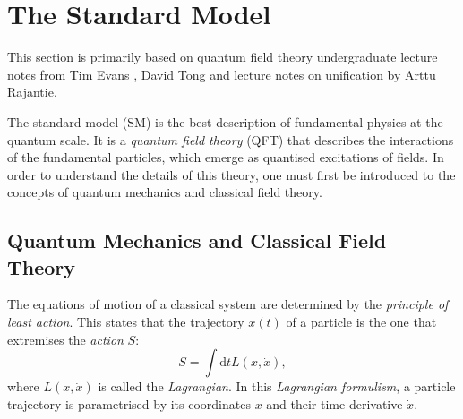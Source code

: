 \section{The Standard Model}
This section is primarily based on quantum field theory undergraduate lecture notes from Tim Evans \cite{timevans}, David Tong \cite{tong} and lecture notes on unification by Arttu Rajantie.

The standard model (SM) is the best description of fundamental physics at the quantum scale. It is a \textit{quantum field theory} (QFT) that describes the interactions of the fundamental particles, which emerge as quantised excitations of fields. In order to understand the details of this theory, one must first be introduced to the concepts of quantum mechanics and classical field theory.

\subsection{Quantum Mechanics and Classical Field Theory}

The equations of motion of a classical system are determined by the \textit{principle of least action}. This states that the trajectory $x(t)$ of a particle is the one that extremises the \textit{action} $S$:
\begin{equation}
    S=\int\mathrm{d}t L(x,\dot{x}),
\end{equation}
where $L(x,\dot{x})$ is called the \textit{Lagrangian}. In this \textit{Lagrangian formulism}, a particle trajectory is parametrised by its coordinates $x$ and their time derivative $\dot{x}$.


